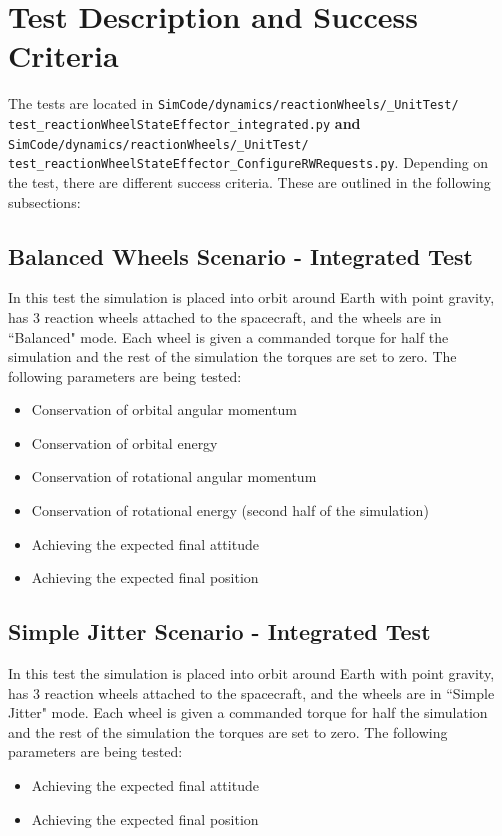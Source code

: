 \section{Test Description and Success Criteria}
The tests are located in \texttt{SimCode/dynamics/reactionWheels/\_UnitTest/\newline
test\_reactionWheelStateEffector\_integrated.py} \textbf{and} \texttt{SimCode/dynamics/reactionWheels/\newline\_UnitTest/
test\_reactionWheelStateEffector\_ConfigureRWRequests.py}. Depending on the test, there are different success criteria. These are outlined in the following subsections:
\subsection{Balanced Wheels Scenario - Integrated Test}
In this test the simulation is placed into orbit around Earth with point gravity, has 3 reaction wheels attached to the spacecraft, and the wheels are in ``Balanced" mode. Each wheel is given a commanded torque for half the simulation and the rest of the simulation the torques are set to zero. The following parameters are being tested:
\begin{itemize}
	\item Conservation of orbital angular momentum
	\item Conservation of orbital energy
	\item Conservation of rotational angular momentum
	\item Conservation of rotational energy (second half of the simulation)
	\item Achieving the expected final attitude
	\item Achieving the expected final position
\end{itemize}

\subsection{Simple Jitter Scenario - Integrated Test}
In this test the simulation is placed into orbit around Earth with point gravity, has 3 reaction wheels attached to the spacecraft, and the wheels are in ``Simple Jitter" mode. Each wheel is given a commanded torque for half the simulation and the rest of the simulation the torques are set to zero. The following parameters are being tested:
\begin{itemize}
\item Achieving the expected final attitude
\item Achieving the expected final position
\end{itemize}

